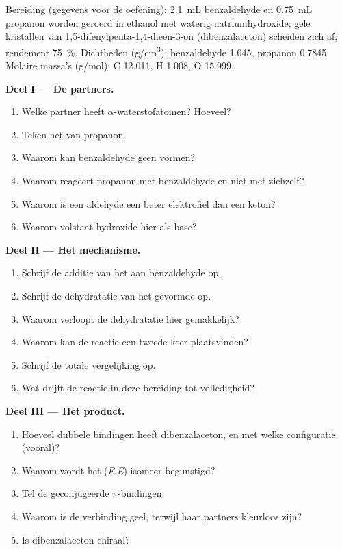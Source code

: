 \begin{problem}
\label{pb:b2:enolates-aldol:1}
Bereiding (gegevens voor de oefening): \qty{2.1}{mL} benzaldehyde en \qty{0.75}{mL} propanon worden geroerd
in ethanol met waterig natriumhydroxide; gele kristallen van 1,5-difenylpenta-1,4-dieen-3-on
(dibenzalaceton) scheiden zich af; rendement 75~\%. Dichtheden (\unit{g/cm^3}): benzaldehyde 1.045, propanon 0.7845.
Molaire massa's (\unit{g/mol}): C 12.011, H 1.008, O 15.999.

\medskip
\noindent\textbf{Deel I --- De partners.}
\begin{enumerate}
  \item Welke partner heeft $\alpha$-waterstofatomen? Hoeveel?
  \item Teken het  van propanon.
  \item Waarom kan benzaldehyde geen  vormen?
  \item Waarom reageert propanon met benzaldehyde en niet met zichzelf?
  \item Waarom is een aldehyde een beter elektrofiel dan een keton?
  \item Waarom volstaat hydroxide hier als base?
\end{enumerate}

\medskip
\noindent\textbf{Deel II --- Het mechanisme.}
\begin{enumerate}[resume]
  \item Schrijf de additie van het  aan benzaldehyde op.
  \item Schrijf de dehydratatie van het gevormde  op.
  \item Waarom verloopt de dehydratatie hier gemakkelijk?
  \item Waarom kan de reactie een tweede keer plaatsvinden?
  \item Schrijf de totale vergelijking op.
  \item Wat drijft de reactie in deze bereiding tot volledigheid?
\end{enumerate}

\medskip
\noindent\textbf{Deel III --- Het product.}
\begin{enumerate}[resume]
  \item Hoeveel dubbele bindingen  heeft dibenzalaceton, en met welke configuratie (vooral)?
  \item Waarom wordt het (\textit{E},\textit{E})-isomeer begunstigd?
  \item Tel de geconjugeerde $\pi$-bindingen.
  \item Waarom is de verbinding geel, terwijl haar partners kleurloos zijn?
  \item Is dibenzalaceton chiraal?
\end{enumerate}


\end{problem}
